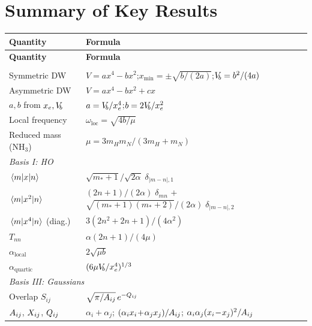 \section{Summary of Key Results}\label{sec:summary}

\begin{center}
\renewcommand{\arraystretch}{1.8}
\begin{longtable}{p{4.5cm}p{10cm}}
  \toprule
  \textbf{Quantity} & \textbf{Formula} \\
  \midrule
  \endfirsthead
  \toprule
  \textbf{Quantity} & \textbf{Formula} \\
  \midrule
  \endhead
  \bottomrule
  \endfoot
  \multicolumn{2}{l}{\textit{Potential}} \\
  Symmetric DW
    & $V = ax^4 - bx^2$;\quad $x_{\min} = \pm\sqrt{b/(2a)}$;\quad $V_{\!b} = b^2/(4a)$ \\
  Asymmetric DW
    & $V = ax^4 - bx^2 + cx$ \\
  $a, b$ from $x_e, V_{\!b}$
    & $a = V_{\!b}/x_e^4$;\quad $b = 2V_{\!b}/x_e^2$ \\
  Local frequency
    & $\omega_{\text{loc}} = \sqrt{4b/\mu}$ \\
  Reduced mass (NH$_3$)
    & $\mu = 3m_Hm_N/(3m_H+m_N)$ \\[4pt]
  \midrule
  \multicolumn{2}{l}{\textit{Basis I: HO}} \\
  $\mel{m}{x}{n}$
    & $\sqrt{m_*\!+\!1}/\sqrt{2\alpha}\;\delta_{|m-n|,1}$ \\
  $\mel{m}{x^2}{n}$
    & $(2n\!+\!1)/(2\alpha)\;\delta_{mn}$ $+$ $\sqrt{(m_*\!+\!1)(m_*\!+\!2)}/(2\alpha)\;\delta_{|m-n|,2}$ \\
  $\mel{m}{x^4}{n}$ (diag.)
    & $3(2n^2\!+\!2n\!+\!1)/(4\alpha^2)$ \\
  $T_{nn}$
    & $\alpha(2n\!+\!1)/(4\mu)$ \\
  $\alpha_{\text{local}}$
    & $2\sqrt{\mu b}$ \\
  $\alpha_{\text{quartic}}$
    & $(6\mu V_{\!b}/x_e^4)^{1/3}$ \\[4pt]
  \midrule
  \multicolumn{2}{l}{\textit{Basis III: Gaussians}} \\
  Overlap $S_{ij}$
    & $\sqrt{\pi/A_{ij}}\,e^{-Q_{ij}}$ \\
  $A_{ij}$, $X_{ij}$, $Q_{ij}$
    & $\alpha_i\!+\!\alpha_j$;\; $(\alpha_ix_i\!+\!\alpha_jx_j)/A_{ij}$;\; $\alpha_i\alpha_j(x_i\!-\!x_j)^2/A_{ij}$ \\

\end{longtable}
\end{center}
